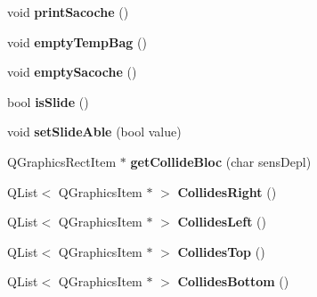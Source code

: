 \begin{DoxyCompactItemize}
\item 
\hypertarget{class_p___penguin_ab0cca82420b5d05abac3b1ad91708cee}{}void {\bfseries print\+Sacoche} ()\label{class_p___penguin_ab0cca82420b5d05abac3b1ad91708cee}

\item 
\hypertarget{class_p___penguin_a503a100e38efae76d85ef4fcfc48f5f4}{}void {\bfseries empty\+Temp\+Bag} ()\label{class_p___penguin_a503a100e38efae76d85ef4fcfc48f5f4}

\item 
\hypertarget{class_p___penguin_a811a01733e76c07687b50027be921f9c}{}void {\bfseries empty\+Sacoche} ()\label{class_p___penguin_a811a01733e76c07687b50027be921f9c}

\item 
\hypertarget{class_p___penguin_a5689f6b76b9ba0392caf2b4b1ee3d45e}{}bool {\bfseries is\+Slide} ()\label{class_p___penguin_a5689f6b76b9ba0392caf2b4b1ee3d45e}

\item 
\hypertarget{class_p___penguin_aec94f3aeeaea4b6b966a0eb2b3381ff5}{}void {\bfseries set\+Slide\+Able} (bool value)\label{class_p___penguin_aec94f3aeeaea4b6b966a0eb2b3381ff5}

\item 
\hypertarget{class_p___penguin_a6c71dd62fd3d22173364265580e18bd0}{}Q\+Graphics\+Rect\+Item $\ast$ {\bfseries get\+Collide\+Bloc} (char sens\+Depl)\label{class_p___penguin_a6c71dd62fd3d22173364265580e18bd0}

\item 
\hypertarget{class_p___penguin_ab1ebdfba816d067af9c77edcae172bc5}{}Q\+List$<$ Q\+Graphics\+Item $\ast$ $>$ {\bfseries Collides\+Right} ()\label{class_p___penguin_ab1ebdfba816d067af9c77edcae172bc5}

\item 
\hypertarget{class_p___penguin_a10030f3faa828357a8bc1ace94e904fa}{}Q\+List$<$ Q\+Graphics\+Item $\ast$ $>$ {\bfseries Collides\+Left} ()\label{class_p___penguin_a10030f3faa828357a8bc1ace94e904fa}

\item 
\hypertarget{class_p___penguin_a1fdcdba9649a704724b87eec381b359c}{}Q\+List$<$ Q\+Graphics\+Item $\ast$ $>$ {\bfseries Collides\+Top} ()\label{class_p___penguin_a1fdcdba9649a704724b87eec381b359c}

\item 
\hypertarget{class_p___penguin_a8f430f243198c9fcaca5eed7949cff98}{}Q\+List$<$ Q\+Graphics\+Item $\ast$ $>$ {\bfseries Collides\+Bottom} ()\label{class_p___penguin_a8f430f243198c9fcaca5eed7949cff98}


\end{DoxyCompactItemize}
